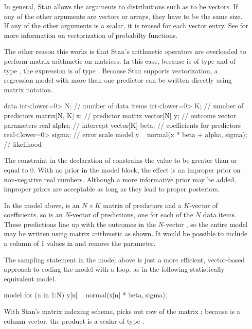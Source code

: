 In general, Stan allows the arguments to distributions such as
 to be vectors.  If any of the other arguments are
vectors or arrays, they have to be the same size.  If any of the other
arguments is a scalar, it is reused for each vector entry.  See
 for more information on vectorization of
probabilty functions.

The other reason this works is that Stan's arithmetic operators are
overloaded to perform matrix arithmetic on matrices.  In this case,
because  is of type  and  of type
, the expression  is of type .
Because Stan supports vectorization, a regression model with more than
one predictor can be written directly using matrix notation.
%
\begin{stancode}
data {
  int<lower=0> N;   // number of data items
  int<lower=0> K;   // number of predictors
  matrix[N, K] x;   // predictor matrix
  vector[N] y;      // outcome vector
}
parameters {
  real alpha;           // intercept
  vector[K] beta;       // coefficients for predictors
  real<lower=0> sigma;  // error scale
}
model {
  y ~ normal(x * beta + alpha, sigma);  // likelihood
}
\end{stancode}
%
The constraint  in the declaration of 
constrains the value to be greater than or equal to 0.  With no prior
in the model block, the effect is an improper prior on non-negative
real numbers.  Although a more informative prior may be added, improper
priors are acceptable as long as they lead to proper posteriors.

In the model above,  is an $N \times K$ matrix of predictors
and  a $K$-vector of coefficients, so  is an
$N$-vector of predictions, one for each of the $N$ data items.  These
predictions line up with the outcomes in the $N$-vector , so
the entire model may be written using matrix arithmetic as shown.  It
would be possible to include a column of 1 values in  and
remove the  parameter.  

The sampling statement in the model above is just a more efficient,
vector-based approach to coding the model with a loop, as in the
following statistically equivalent model.
%
\begin{stancode}
model {
  for (n in 1:N)
    y[n] ~ normal(x[n] * beta, sigma);
}
\end{stancode}
%
With Stan's matrix indexing scheme,  picks out row 
of the matrix ;  because  is a column vector, 
the product  is a scalar of type .

